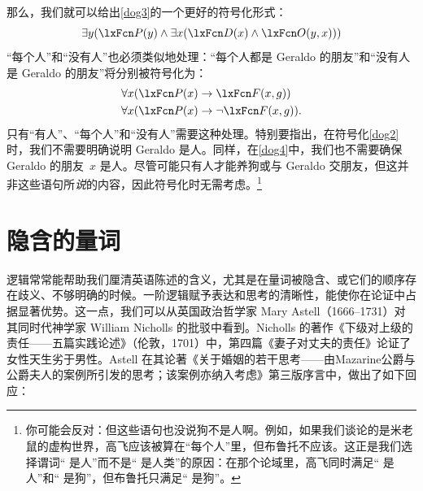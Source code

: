 那么，我们就可以给出\cref{dog3}的一个更好的符号化形式：
$$\exists y (\atom{P}{y} \eand \exists x(\atom{D}{x} \eand
\atom{O}{y,x}))$$
“每个人”和“没有人”也必须类似地处理：“每个人都是 Geraldo 的朋友”和“没有人是 Geraldo 的朋友”将分别被符号化为：
\begin{align*}
	& \forall x(\atom{P}{x} \eif \atom{F}{x,g})\\
	& \forall x(\atom{P}{x} \eif \enot\atom{F}{x,g}).
\end{align*}
只有“有人”、“每个人”和“没有人”需要这种处理。特别要指出，在符号化\cref{dog2}时，我们不需要明确说明 Geraldo 是人。同样，在\cref{dog4}中，我们也不需要确保 Geraldo 的朋友~$x$ 是人。尽管可能只有人才能养狗或与 Geraldo 交朋友，但这并非这些语句所\emph{说}的内容，因此符号化时无需考虑。\footnote{你可能会反对：但这些语句也没说狗不是人啊。例如，如果我们谈论的是米老鼠的虚构世界，高飞应该被算在“每个人”里，但布鲁托不应该。这正是我们选择谓词“\blank{} 是人”而不是“\blank{} 是人类”的原因：在那个论域里，高飞同时满足“\blank{} 是人”和“\blank{} 是狗”，但布鲁托只满足“\blank{} 是狗”。}

\section{隐含的量词}\label{ss:SuppQuant}

逻辑常常能帮助我们厘清英语陈述的含义，尤其是在量词被隐含、或它们的顺序存在歧义、不够明确的时候。一阶逻辑赋予表达和思考的清晰性，能使你在论证中占据显著优势。这一点，我们可以从英国政治哲学家 Mary Astell（1666--1731）对其同时代神学家 William Nicholls 的批驳中看到。Nicholls 的著作《下级对上级的责任——五篇实践论述》（伦敦，1701）中，第四篇《妻子对丈夫的责任》论证了女性天生劣于男性。Astell 在其论著《关于婚姻的若干思考——由Mazarine公爵与公爵夫人的案例所引发的思考；该案例亦纳入考虑》第三版序言中，做出了如下回应：

